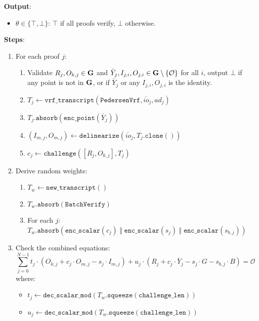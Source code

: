 \documentclass[
]{article}
\providecommand{\tightlist}{%
  \setlength{\itemsep}{0pt}\setlength{\parskip}{0pt}}
\begin{document}
\textbf{Output}:

\begin{itemize}
\tightlist
\item
  \(\theta \in \{ \top, \bot \}\): \(\top\) if all proofs verify,
  \(\bot\) otherwise.
\end{itemize}

\textbf{Steps}:

\begin{enumerate}
\def\labelenumi{\arabic{enumi}.}
\tightlist
\item
  For each proof \(j\):

  \begin{enumerate}
  \def\labelenumii{\alph{enumii}.}
  \tightlist
  \item
    Validate \(R_j, O_{k,j} \in \bold{G}\) and
    \(\bar{Y}_j, I_{j,i}, O_{j,i} \in \bold{G}\setminus \{\mathcal{O}\}\)
    for all \(i\), output \(\bot\) if any point is not in \(\bold{G}\),
    or if \(\bar{Y}_j\) or any \(I_{j,i}, O_{j,i}\) is the identity.
  \item
    \(T_j \gets \texttt{vrf\_transcript}(\texttt{PedersenVrf}, \overline{io}_j, ad_j)\)
  \item
    \(T_j.\texttt{absorb}(\texttt{enc\_point}(\bar{Y}_j))\)
  \item
    \((I_{m,j}, O_{m,j}) \gets \texttt{delinearize}(\overline{io}_j, T_j.\texttt{clone}())\)
  \item
    \(c_j \gets \texttt{challenge}([R_j, O_{k,j}], T_j)\)
  \end{enumerate}
\item
  Derive random weights:

  \begin{enumerate}
  \def\labelenumii{\alph{enumii}.}
  \tightlist
  \item
    \(T_w \gets \texttt{new\_transcript}()\)
  \item
    \(T_w.\texttt{absorb}(\texttt{BatchVerify})\)
  \item
    For each \(j\):
    \(T_w.\texttt{absorb}(\texttt{enc\_scalar}(c_j) \;\Vert\; \texttt{enc\_scalar}(s_j) \;\Vert\; \texttt{enc\_scalar}(s_{b,j}))\)
  \end{enumerate}
\item
  Check the combined equations:
  \[\sum_{j=0}^{N-1} t_j \cdot (O_{k,j} + c_j \cdot O_{m,j} - s_j \cdot I_{m,j}) + u_j \cdot (R_j + c_j \cdot \bar{Y}_j - s_j \cdot G - s_{b,j} \cdot B) = \mathcal{O}\]
  where:

  \begin{itemize}
  \tightlist
  \item
    \(t_j \gets \texttt{dec\_scalar\_mod}(T_w.\texttt{squeeze}(\texttt{challenge\_len}))\)
  \item
    \(u_j \gets \texttt{dec\_scalar\_mod}(T_w.\texttt{squeeze}(\texttt{challenge\_len}))\)
  \end{itemize}
\end{enumerate}
\end{document}
